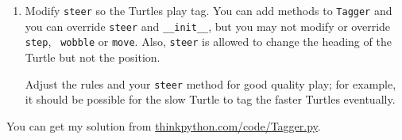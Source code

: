 \begin{exercise}
\begin{enumerate}
\item Modify {\tt steer} so the Turtles play tag.  You can add methods
  to {\tt Tagger} and you can override {\tt steer} and
  \verb"__init__", but you may not modify or override {\tt step}, {\tt
    wobble} or {\tt move}.  Also, {\tt steer} is allowed to change the
  heading of the Turtle but not the position.

Adjust the rules and your {\tt steer} method for good quality play;
for example, it should be possible for the slow Turtle to tag the
faster Turtles eventually.

\end{enumerate}

You can get my solution from \url{thinkpython.com/code/Tagger.py}.
\end{exercise}

